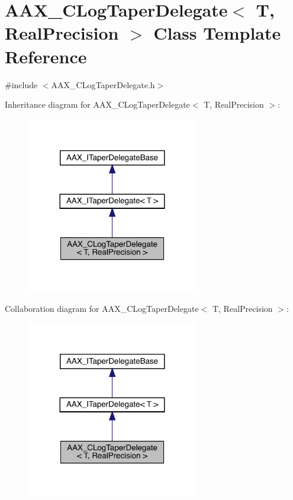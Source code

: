 \hypertarget{a01497}{}\section{A\+A\+X\+\_\+\+C\+Log\+Taper\+Delegate$<$ T, Real\+Precision $>$ Class Template Reference}
\label{a01497}


{\ttfamily \#include $<$A\+A\+X\+\_\+\+C\+Log\+Taper\+Delegate.\+h$>$}



Inheritance diagram for A\+A\+X\+\_\+\+C\+Log\+Taper\+Delegate$<$ T, Real\+Precision $>$\+:
\nopagebreak
\begin{figure}[H]
\begin{center}
\leavevmode
\includegraphics[width=212pt]{a01496}
\end{center}
\end{figure}


Collaboration diagram for A\+A\+X\+\_\+\+C\+Log\+Taper\+Delegate$<$ T, Real\+Precision $>$\+:
\nopagebreak
\begin{figure}[H]
\begin{center}
\leavevmode
\includegraphics[width=212pt]{a01495}
\end{center}
\end{figure}


